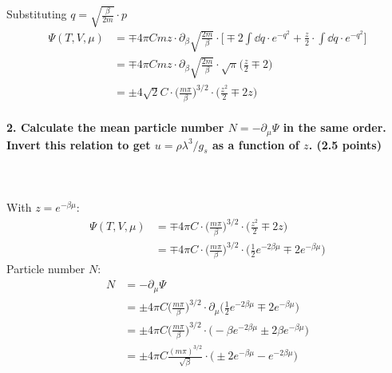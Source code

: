     Substituting $q=\sqrt{\frac{\beta}{2m}}\cdot p$
    \begin{align}
        \Psi(T,V,\mu)
        &=\mp 4\pi Cmz\cdot\partial_\beta
            \sqrt{\frac{2m}{\beta}}\cdot\bigg[
            \mp2\int \dd q\cdot
                e^{-q^2}
            +\frac{z}{2}\cdot\int \dd q\cdot
                e^{-q^2}
        \bigg] \\
        &=\mp 4\pi Cmz\cdot\partial_\beta
        \sqrt{\frac{2m}{\beta}}\cdot\sqrt{\pi}\bigg(
            \frac{z}{2}\mp2
        \bigg) \\
        &=\pm 4\sqrt{2}C\cdot
        \bigg(
            \frac{m\pi}{\beta}
            \bigg)^{3/2}\cdot\bigg(
            \frac{z^2}{2}\mp2z
        \bigg)
    \end{align}

\newpage
\paragraph{2. Calculate the mean particle number 
    $N =-\partial_\mu\Psi$ in the same order. Invert this 
    relation to get $u=\rho\lambda^3/g_s$ as a function of $z$. 
    (2.5 points)
} \ \\
    \\
    With $z=e^{-\beta\mu}$:
    \begin{align}
        \Psi(T,V,\mu)
        &=\mp 4\pi C\cdot\bigg(
            \frac{m\pi}{\beta}
            \bigg)^{3/2}\cdot\bigg(
            \frac{z^2}{2}\mp2z
        \bigg) \\
        &=\mp 4\pi C\cdot\bigg(
            \frac{m\pi}{\beta}
            \bigg)^{3/2}\cdot\bigg(
            \frac{1}{2}e^{-2\beta\mu}\mp2e^{-\beta\mu}
        \bigg)
    \end{align}
    Particle number $N$:
    \begin{align}
        N
        &=-\partial_\mu\Psi \\
        &=\pm 4\pi C\bigg(
            \frac{m\pi}{\beta}
        \bigg)^{3/2}\cdot\partial_\mu\bigg(
            \frac{1}{2}e^{-2\beta\mu}\mp2e^{-\beta\mu}
        \bigg) \\
        &=\pm 4\pi C\bigg(
            \frac{m\pi}{\beta}
        \bigg)^{3/2}\cdot\bigg(
            -\beta e^{-2\beta\mu}\pm2\beta e^{-\beta\mu}
        \bigg) \\
        &=\pm 4\pi C\frac{(m\pi)^{3/2}}{\sqrt{\beta}}
        \cdot\bigg(
            \pm2e^{-\beta\mu}-e^{-2\beta\mu}
        \bigg)
    \end{align}

